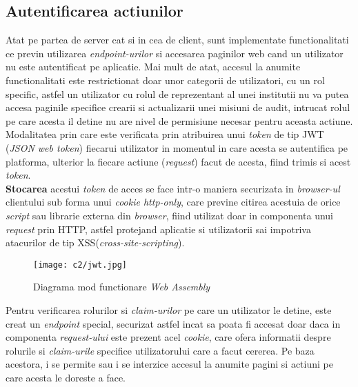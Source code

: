 \subsection*{Autentificarea actiunilor}

Atat pe partea de server cat si in cea de client, sunt implementate functionalitati ce previn utilizarea \textit{endpoint-urilor} si accesarea paginilor web cand un utilizator nu este autentificat pe aplicatie. Mai mult de atat, accesul la anumite functionalitati este restrictionat doar unor categorii de utilizatori, cu un rol specific, astfel un utilizator cu rolul de reprezentant al unei institutii nu va putea accesa paginile specifice crearii si actualizarii unei misiuni de audit, intrucat rolul pe care acesta il detine nu are nivel de permisiune necesar pentru aceasta actiune.\\
Modalitatea prin care este verificata prin atribuirea unui \textit{token} de tip JWT (\textit{JSON web token}) fiecarui utilizator in momentul in care acesta se autentifica pe platforma, ulterior la fiecare actiune (\textit{request}) facut de acesta, fiind trimis si acest \textit{token}.\\



\textbf{Stocarea} acestui \textit{token} de acces se face intr-o maniera securizata in \textit{browser-ul} clientului sub forma unui \textit{cookie http-only}, care previne citirea acestuia de orice \textit{script} sau librarie externa din \textit{browser}, fiind utilizat doar in componenta unui \textit{request} prin HTTP, astfel protejand aplicatie si utilizatorii sai impotriva atacurilor de tip XSS(\textit{cross-site-scripting}).

\vspace{1cm}
\begin{figure}[h]
	\centering
	
	\texttt{[image: c2/jwt.jpg]}
	\caption{Diagrama mod functionare \textit{Web Assembly}}
\end{figure}

Pentru verificarea rolurilor si \textit{claim-urilor} pe care un utilizator le detine, este creat un \textit{endpoint} special, securizat astfel incat sa poata fi accesat doar daca in componenta \textit{request-ului} este prezent acel \textit{cookie}, care ofera informatii despre rolurile si \textit{claim-urile} specifice utilizatorului care a facut cererea. Pe baza acestora, i se permite sau i se interzice accesul la anumite pagini si actiuni pe care acesta le doreste a face.


